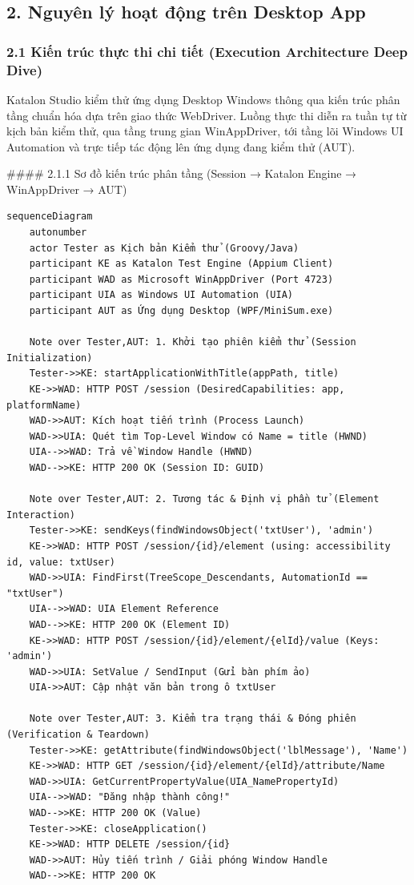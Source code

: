 \subsection{2. Nguyên lý hoạt động trên Desktop App}

\subsubsection{2.1 Kiến trúc thực thi chi tiết (Execution Architecture Deep Dive)}

Katalon Studio kiểm thử ứng dụng Desktop Windows thông qua kiến trúc phân tầng chuẩn hóa dựa trên giao thức WebDriver. Luồng thực thi diễn ra tuần tự từ kịch bản kiểm thử, qua tầng trung gian WinAppDriver, tới tầng lõi Windows UI Automation và trực tiếp tác động lên ứng dụng đang kiểm thử (AUT).

#### 2.1.1 Sơ đồ kiến trúc phân tầng (Session → Katalon Engine → WinAppDriver → AUT)

\begin{lstlisting}
sequenceDiagram
    autonumber
    actor Tester as Kịch bản Kiểm thử (Groovy/Java)
    participant KE as Katalon Test Engine (Appium Client)
    participant WAD as Microsoft WinAppDriver (Port 4723)
    participant UIA as Windows UI Automation (UIA)
    participant AUT as Ứng dụng Desktop (WPF/MiniSum.exe)

    Note over Tester,AUT: 1. Khởi tạo phiên kiểm thử (Session Initialization)
    Tester->>KE: startApplicationWithTitle(appPath, title)
    KE->>WAD: HTTP POST /session (DesiredCapabilities: app, platformName)
    WAD->>AUT: Kích hoạt tiến trình (Process Launch)
    WAD->>UIA: Quét tìm Top-Level Window có Name = title (HWND)
    UIA-->>WAD: Trả về Window Handle (HWND)
    WAD-->>KE: HTTP 200 OK (Session ID: GUID)
    
    Note over Tester,AUT: 2. Tương tác & Định vị phần tử (Element Interaction)
    Tester->>KE: sendKeys(findWindowsObject('txtUser'), 'admin')
    KE->>WAD: HTTP POST /session/{id}/element (using: accessibility id, value: txtUser)
    WAD->>UIA: FindFirst(TreeScope_Descendants, AutomationId == "txtUser")
    UIA-->>WAD: UIA Element Reference
    WAD-->>KE: HTTP 200 OK (Element ID)
    KE->>WAD: HTTP POST /session/{id}/element/{elId}/value (Keys: 'admin')
    WAD->>UIA: SetValue / SendInput (Gửi bàn phím ảo)
    UIA->>AUT: Cập nhật văn bản trong ô txtUser
    
    Note over Tester,AUT: 3. Kiểm tra trạng thái & Đóng phiên (Verification & Teardown)
    Tester->>KE: getAttribute(findWindowsObject('lblMessage'), 'Name')
    KE->>WAD: HTTP GET /session/{id}/element/{elId}/attribute/Name
    WAD->>UIA: GetCurrentPropertyValue(UIA_NamePropertyId)
    UIA-->>WAD: "Đăng nhập thành công!"
    WAD-->>KE: HTTP 200 OK (Value)
    Tester->>KE: closeApplication()
    KE->>WAD: HTTP DELETE /session/{id}
    WAD->>AUT: Hủy tiến trình / Giải phóng Window Handle
    WAD-->>KE: HTTP 200 OK
\end{lstlisting}


